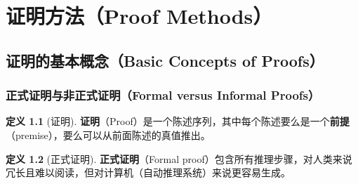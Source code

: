 \documentclass[UTF8,11pt,a4paper]{ctexbook}   %
\theoremstyle{definition}
\newtheorem{definition}{定义}[section]
\begin{document}
\chapter{证明方法（Proof Methods）}

\section{证明的基本概念（Basic Concepts of Proofs）}

\subsection{正式证明与非正式证明（Formal versus Informal Proofs）}

\begin{definition}[证明]
\textbf{证明}（Proof）是一个陈述序列，其中每个陈述要么是一个\textbf{前提}（premise），要么可以从前面陈述的真值推出。
\end{definition}

\begin{definition}[正式证明]
\textbf{正式证明}（Formal proof）包含所有推理步骤，对人类来说冗长且难以阅读，但对计算机（自动推理系统）来说更容易生成。
\end{definition}
\end{document}
